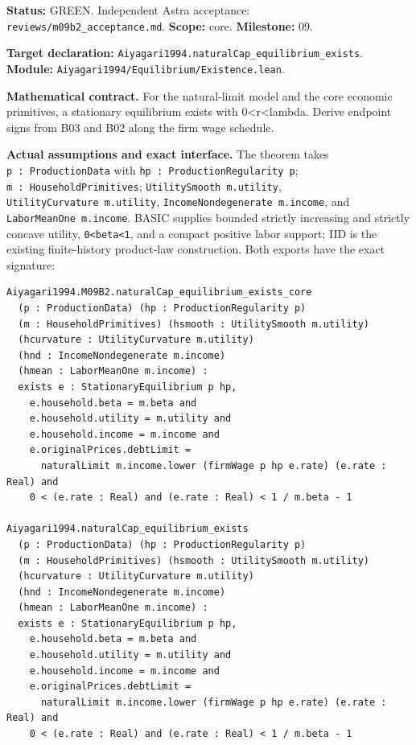\documentclass[
  11pt,
]{article}
\let\LedgerOriginalTexttt\texttt
\renewcommand{\texttt}[1]{{\small\LedgerOriginalTexttt{#1}}}
\begin{document}
\textbf{Status:} GREEN. Independent Astra acceptance:
\texttt{reviews/m09b2\_acceptance.md}. \textbf{Scope:} core.
\textbf{Milestone:} 09.

\textbf{Target declaration:}
\texttt{Aiyagari1994.naturalCap\_equilibrium\_exists}.\\
\textbf{Module:} \texttt{Aiyagari1994/Equilibrium/Existence.lean}.

\textbf{Mathematical contract.} For the natural-limit model and the core
economic primitives, a stationary equilibrium exists with
0\textless r\textless lambda. Derive endpoint signs from B03 and B02
along the firm wage schedule.

\textbf{Actual assumptions and exact interface.} The theorem takes
\texttt{p\ :\ ProductionData} with
\texttt{hp\ :\ ProductionRegularity\ p};
\texttt{m\ :\ HouseholdPrimitives}; \texttt{UtilitySmooth\ m.utility},
\texttt{UtilityCurvature\ m.utility},
\texttt{IncomeNondegenerate\ m.income}, and
\texttt{LaborMeanOne\ m.income}. BASIC supplies bounded strictly
increasing and strictly concave utility,
\texttt{0\textless{}beta\textless{}1}, and a compact positive labor
support; IID is the existing finite-history product-law construction.
Both exports have the exact signature:

\begin{verbatim}
Aiyagari1994.M09B2.naturalCap_equilibrium_exists_core
  (p : ProductionData) (hp : ProductionRegularity p)
  (m : HouseholdPrimitives) (hsmooth : UtilitySmooth m.utility)
  (hcurvature : UtilityCurvature m.utility)
  (hnd : IncomeNondegenerate m.income)
  (hmean : LaborMeanOne m.income) :
  exists e : StationaryEquilibrium p hp,
    e.household.beta = m.beta and
    e.household.utility = m.utility and
    e.household.income = m.income and
    e.originalPrices.debtLimit =
      naturalLimit m.income.lower (firmWage p hp e.rate) (e.rate : Real) and
    0 < (e.rate : Real) and (e.rate : Real) < 1 / m.beta - 1

Aiyagari1994.naturalCap_equilibrium_exists
  (p : ProductionData) (hp : ProductionRegularity p)
  (m : HouseholdPrimitives) (hsmooth : UtilitySmooth m.utility)
  (hcurvature : UtilityCurvature m.utility)
  (hnd : IncomeNondegenerate m.income)
  (hmean : LaborMeanOne m.income) :
  exists e : StationaryEquilibrium p hp,
    e.household.beta = m.beta and
    e.household.utility = m.utility and
    e.household.income = m.income and
    e.originalPrices.debtLimit =
      naturalLimit m.income.lower (firmWage p hp e.rate) (e.rate : Real) and
    0 < (e.rate : Real) and (e.rate : Real) < 1 / m.beta - 1
\end{verbatim}
\end{document}
